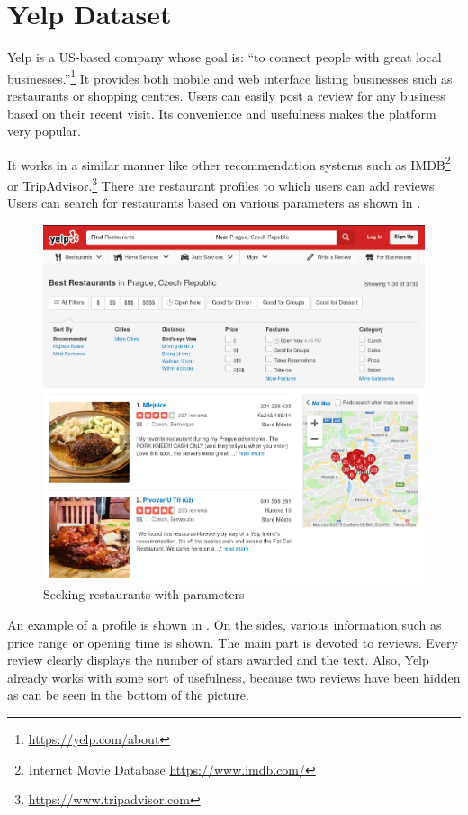 \chapter{Yelp Dataset}\label{app:dataset}

Yelp is a US-based company whose goal is: ``to connect people with great local businesses.''\footnote{\url{https://yelp.com/about}}
It provides both mobile and web interface listing businesses such as restaurants or shopping centres.
Users can easily post a review for any business based on their recent visit.
Its convenience and usefulness makes the platform very popular.

It works in a similar manner like other recommendation systems such as IMDB\footnote{Internet Movie Database \url{https://www.imdb.com/}} or
TripAdvisor.\footnote{\url{https://www.tripadvisor.com}}
There are restaurant profiles to which users can add reviews.
Users can search for restaurants based on various parameters as shown in .

\begin{figure}[ht]\centering
\includegraphics[width=130mm]{../img/filters.png}
\caption{Seeking restaurants with parameters}
\label{fig:filters}
\end{figure}

An example of a profile is shown in .
On the sides, various information such as price range or opening time is shown.
The main part is devoted to reviews.
Every review clearly displays the number of stars awarded and the text.
Also, Yelp already works with some sort of usefulness,
because two reviews have been hidden as can be seen in the bottom of the picture.

